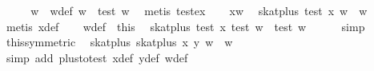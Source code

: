\begin{isabellebody}
\ \ \isamarkupfalse%
\ \isamarkupfalse%
\ w{}\ \ w{}{}def{}\ {}w\ {}\ test\ w{}{}\ \isamarkupfalse%
\ {}metis\ test{}ex{}\isanewline
\ \ \isamarkupfalse%
\ xw\ \isamarkupfalse%
\ {}skat{}plus\ {}test\ x{}{}\ w\ {}\ w{}\isanewline
\ \ \ \ \isamarkupfalse%
\ {}metis\ x{}{}def{}\isanewline
\ \ \isamarkupfalse%
\ w{}{}def\ \ this\ \isamarkupfalse%
\ {}skat{}plus\ {}test\ x{}{}\ {}test\ w{}{}\ {}\ {}test\ w{}{}{}\isanewline
\ \ \ \ \isamarkupfalse%
\ simp\isanewline
\ \ \isamarkupfalse%
\ this{}symmetric{}\ \isamarkupfalse%
\ {}skat{}plus\ {}skat{}plus\ x\ y{}\ w\ {}\ w{}\isanewline
\ \ \ \ \isamarkupfalse%
\ {}simp\ add{}\ plus{}to{}test\ x{}{}def\ y{}{}def\ w{}{}def{}\isanewline

\end{isabellebody}
